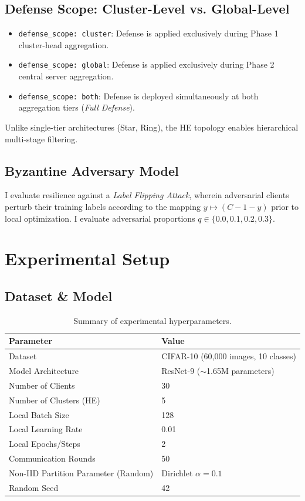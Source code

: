 \documentclass[11pt, a4paper]{article}
\begin{document}
\subsection{Defense Scope: Cluster-Level vs. Global-Level}
\begin{itemize}
    \item \texttt{defense\_scope: cluster}: Defense is applied exclusively during Phase 1 cluster-head aggregation.
    \item \texttt{defense\_scope: global}: Defense is applied exclusively during Phase 2 central server aggregation.
    \item \texttt{defense\_scope: both}: Defense is deployed simultaneously at both aggregation tiers (\textit{Full Defense}).
\end{itemize}
Unlike single-tier architectures (Star, Ring), the HE topology enables hierarchical multi-stage filtering.

\subsection{Byzantine Adversary Model}
I evaluate resilience against a \textit{Label Flipping Attack}, wherein adversarial clients perturb their training labels according to the mapping $y \mapsto (C - 1 - y)$ prior to local optimization. I evaluate adversarial proportions $q \in \{0.0, 0.1, 0.2, 0.3\}$.

\section{Experimental Setup}

\subsection{Dataset \& Model}
\begin{table}[H]
    \centering
    \begin{tabular}{ll}
        \toprule
        \textbf{Parameter} & \textbf{Value} \\
        \midrule
        Dataset & CIFAR-10 (60,000 images, 10 classes) \\
        Model Architecture & ResNet-9 ($\sim$1.65M parameters) \\
        Number of Clients & 30 \\
        Number of Clusters (HE) & 5 \\
        Local Batch Size & 128 \\
        Local Learning Rate & 0.01 \\
        Local Epochs/Steps & 2 \\
        Communication Rounds & 50 \\
        Non-IID Partition Parameter (Random) & Dirichlet $\alpha = 0.1$ \\
        Random Seed & 42 \\
        \bottomrule
    \end{tabular}
    \caption{Summary of experimental hyperparameters.}
\end{table}
\end{document}
